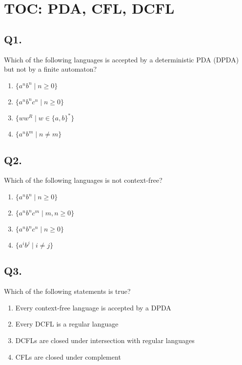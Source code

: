 

\newpage
\section{TOC: PDA, CFL, DCFL}

\subsection*{Q1.}
Which of the following languages is accepted by a deterministic PDA (DPDA) but not by a finite automaton?

\begin{enumerate}[label=(\alph*)]
    \item $\{a^n b^n \mid n \geq 0\}$  
    \item $\{a^n b^n c^n \mid n \geq 0\}$  
    \item $\{w w^R \mid w \in \{a, b\}^*\}$  
    \item $\{a^n b^m \mid n \neq m\}$  
\end{enumerate}

\vspace{1em}

\subsection*{Q2.}
Which of the following languages is not context-free?

\begin{enumerate}[label=(\alph*)]
    \item $\{a^n b^n \mid n \geq 0\}$  
    \item $\{a^n b^n c^m \mid m, n \geq 0\}$  
    \item $\{a^n b^n c^n \mid n \geq 0\}$  
    \item $\{a^i b^j \mid i \neq j\}$  
\end{enumerate}

\vspace{1em}

\subsection*{Q3.}
Which of the following statements is true?

\begin{enumerate}[label=(\alph*)]
    \item Every context-free language is accepted by a DPDA  
    \item Every DCFL is a regular language  
    \item DCFLs are closed under intersection with regular languages  
    \item CFLs are closed under complement  
\end{enumerate}

